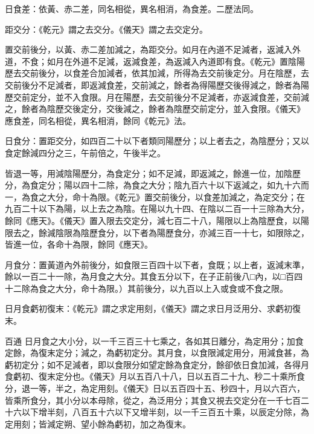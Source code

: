 \begin{pinyinscope}
 日食差：依黃、赤二差，同名相從，異名相消，為食差。二歷法同。



 距交分：《乾元》謂之去交分。《儀天》謂之去交定分。



 置交前後分，以黃、赤二差加減之，為距交分。如月在內道不足減者，返減入外道，不食；如月在外道不足減，返減食差，為返減入內道即有食。《乾元》置陰陽歷去交前後分，以食差合加減者，依其加減，所得為去交前後定分。月在陰歷，去交前後分不足減者，即返減食差，交前減之，餘者為得陽歷交後得減之，餘者為陽歷交前定分，並不入食限。月在陽歷，去交前後分不足減者，亦返減食差，交前減之，餘者為陰歷交後定分，交後減之，餘者為陰歷交前定分，並入食限。《儀天》應食差，同名相從，異名相消，餘同《乾元》法。



 日食分：置距交分，如四百二十以下者類同陽歷分；以上者去之，為陰歷分；又以食定餘減四分之三，午前倍之，午後半之。



 皆退一等，用減陰陽歷分，為食定分；如不足減，即返減之，餘進一位，加陰歷分，為食定分；陽以四十二除，為食之大分；陰九百六十以下返減之，如九十六而一，為食之大分，命十為限。《乾元》置交前後分，以食差加減之，為定交分；在九百二十以下為陽，以上去之為陰。在陽以九十四、在陰以二百一十三除為大分，餘同《應天》。《儀天》置入限去交定分，減七百二十八，陽限以上為陰歷食，以陽限去之，餘減陰限為陰歷食分，以下者為陽歷食分，亦減三百一十七，如限除之，
 皆進一位，各命十為限，餘同《應天》。


月食分：置黃道內外前後分，如食限三百四十以下者，食既；以上者，返減末準，餘以一百二十一除，為月食之大分。其食五分以下，在子正前後八□內，以□百四十二除為食之大分，命十為限。）其前後分，以九百以上入或食或不食之限。



 日月食虧初復末：《乾元》謂之求定用刻，《儀天》謂之求日月泛用分、求虧初復末。



 百通
 日月食之大小分，以一千三百三十七乘之，各如其日離分，為定用分；加食定餘，為復末定分；減之，為虧初定分。其月食，以食限減定用分，用減食甚，為虧初定分；如不足減者，即以食限分如望定餘為食定分，餘卻依日食加減，各得月食虧初、復末定分也。《儀天》月以五百八十八，日以五百二十九、秒二十乘所食分，退一等，半之，為定用刻。《儀天》日以五百四十五、秒四十，月以六百六，皆乘所食分，其小分以本母除，從之，為泛用分；其食又視去交定分在一千七百二十六以下增半刻，八百五十六以下又增半刻，以一千三百五十乘，以辰定分除，為定用刻；皆減定朔、望小餘為虧初，加之為復末。




\end{pinyinscope}
